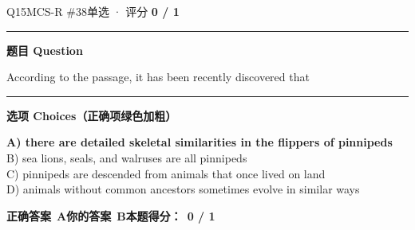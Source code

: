 \documentclass[11pt]{article}
\newcommand{\ptesub}[1]{%
  \par\needspace{2\baselineskip}\smallskip
  {\color{cAccent}\rule[-0.2ex]{3pt}{1.05em}}\hspace{6pt}%
  {\bfseries\color{cHead}#1}\par\nopagebreak\smallskip}
\begin{document}
\begin{qblock}{Q15\quad MCS-R \#38}{单选 · 评分 \textcolor{cAccent}{\bfseries 0 / 1}}
\ptesub{题目 Question}
\begin{notebox}According to the passage, it has been recently discovered that\end{notebox}
\ptesub{选项 Choices（正确项绿色加粗）}
{\small
{\color{cFix}\textbf{A) there are detailed skeletal similarities in the flippers of pinnipeds}}\\
B) sea lions, seals, and walruses are all pinnipeds\\
C) pinnipeds are descended from animals that once lived on land\\
D) animals without common ancestors sometimes evolve in similar ways}
\par\smallskip
\textbf{正确答案}\ \textcolor{cFix}{\bfseries A}\qquad\textbf{你的答案}\ {\color{cWrong}\bfseries B}\qquad\textbf{本题得分：}\ {\color{cAccent}\bfseries 0 / 1}
\end{qblock}
\end{document}
